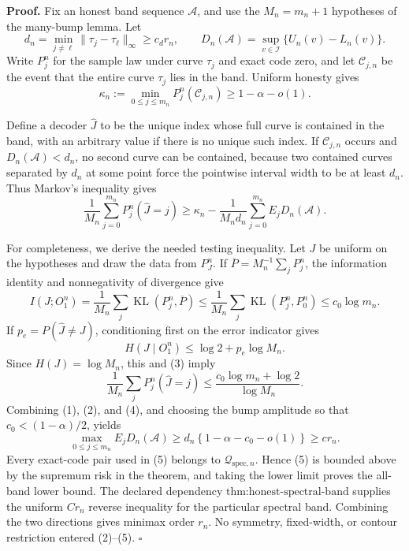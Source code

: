 \textbf{Proof.}
Fix an honest band sequence \(\mathcal A\), and use the \(M_n=m_n+1\) hypotheses of the many-bump lemma.  Let
\[
 d_n=\min_{j\ne\ell}\|\tau_j-\tau_\ell\|_\infty\ge c_dr_n,
 \qquad
 D_n(\mathcal A)=\sup_{v\in\mathcal I}\{U_n(v)-L_n(v)\}.
\]
Write \(P_j^n\) for the sample law under curve \(\tau_j\) and exact code zero, and let \(\mathcal C_{j,n}\) be the event that the entire curve \(\tau_j\) lies in the band.  Uniform honesty gives
\[
 \kappa_n:=\min_{0\le j\le m_n}P_j^n(\mathcal C_{j,n})
 \ge1-\alpha-o(1). \tag{1}
\]

Define a decoder \(\widehat J\) to be the unique index whose full curve is contained in the band, with an arbitrary value if there is no unique such index.  If \(\mathcal C_{j,n}\) occurs and \(D_n(\mathcal A)<d_n\), no second curve can be contained, because two contained curves separated by \(d_n\) at some point force the pointwise interval width to be at least \(d_n\).  Thus Markov's inequality gives
\[
 \frac1{M_n}\sum_{j=0}^{m_n}P_j^n(\widehat J=j)
 \ge \kappa_n-\frac{1}{M_nd_n}\sum_{j=0}^{m_n}E_jD_n(\mathcal A). \tag{2}
\]

For completeness, we derive the needed testing inequality.  Let \(J\) be uniform on the hypotheses and draw the data from \(P_J^n\).  If \(\overline P=M_n^{-1}\sum_jP_j^n\), the information identity and nonnegativity of divergence give
\[
 I(J;O_1^n)=\frac1{M_n}\sum_j\operatorname{KL}(P_j^n,\overline P)
 \le\frac1{M_n}\sum_j\operatorname{KL}(P_j^n,P_0^n)
 \le c_0\log m_n. \tag{3}
\]
If \(p_e=P(\widehat J\ne J)\), conditioning first on the error indicator gives
\[
 H(J\mid O_1^n)\le\log2+p_e\log M_n.
\]
Since \(H(J)=\log M_n\), this and (3) imply
\[
 \frac1{M_n}\sum_jP_j^n(\widehat J=j)
 \le\frac{c_0\log m_n+\log2}{\log M_n}. \tag{4}
\]
Combining (1), (2), and (4), and choosing the bump amplitude so that \(c_0<(1-\alpha)/2\), yields
\[
 \max_{0\le j\le m_n}E_jD_n(\mathcal A)
 \ge d_n\left\{1-\alpha-c_0-o(1)\right\}
 \ge c r_n. \tag{5}
\]
Every exact-code pair used in (5) belongs to \(\mathcal Q_{\mathrm{spec},n}\).  Hence (5) is bounded above by the supremum risk in the theorem, and taking the lower limit proves the all-band lower bound.  The declared dependency \(\text{thm:honest-spectral-band}\) supplies the uniform \(Cr_n\) reverse inequality for the particular spectral band.  Combining the two directions gives minimax order \(r_n\).  No symmetry, fixed-width, or contour restriction entered (2)--(5). \(\square\)